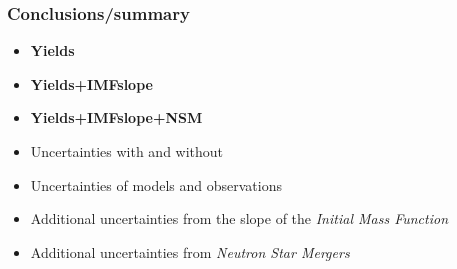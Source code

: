 \begin{frame}
  \frametitle{Conclusions/summary}
  \begin{itemize}
  \item \textbf{Yields}
  \item \textbf{Yields+IMFslope} 
  \item \textbf{Yields+IMFslope+NSM}
  \end{itemize}
  \vfill
  \begin{itemize}
  \item Uncertainties with and without \betadecay
  \item Uncertainties of models and observations
  \item Additional uncertainties from the slope of the \textit{Initial Mass Function}
  \item Additional uncertainties from \textit{Neutron Star Mergers}
  \end{itemize}
\end{frame}
